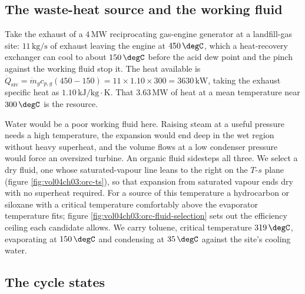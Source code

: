 \subsection{The waste-heat source and the working fluid}

Take the exhaust of a $4\,\text{MW}$ reciprocating gas-engine generator at a
landfill-gas site: $11\,\text{kg}/\text{s}$ of exhaust leaving the engine at
$450\,\degC$, which a heat-recovery exchanger can cool to about $150\,\degC$
before the acid dew point and the pinch against the working fluid stop it. The
heat available is $\dot Q_{\text{src}} = \dot m_g c_{p,g}(450 - 150) = 11 \times
1.10 \times 300 = 3630\,\text{kW}$, taking the exhaust specific heat as
$1.10\,\text{kJ}/\text{kg}\cdot\text{K}$. That $3.63\,\text{MW}$ of heat at a
mean temperature near $300\,\degC$ is the resource.

Water would be a poor working fluid here. Raising steam at a useful pressure
needs a high temperature, the expansion would end deep in the wet region without
heavy superheat, and the volume flows at a low condenser pressure would force an
oversized turbine. An organic fluid sidesteps all three. We select a dry fluid,
one whose saturated-vapour line leans to the right on the $T$-$s$ plane
(figure \ref{fig:vol04ch03:orc-ts}), so that expansion from saturated vapour ends
dry with no superheat required. For a source of this temperature a hydrocarbon or
siloxane with a critical temperature comfortably above the evaporator temperature
fits; figure \ref{fig:vol04ch03:orc-fluid-selection} sets out the efficiency
ceiling each candidate allows. We carry toluene, critical temperature
$319\,\degC$, evaporating at $150\,\degC$ and condensing at $35\,\degC$ against
the site's cooling water.





\subsection{The cycle states}

